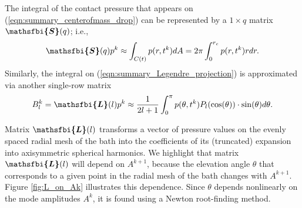 \documentclass{jfm}
\newcommand{\bfjfm}[1]{\bm{\mathsfbi{#1}}}
\begin{document}
The integral of the contact pressure that appears on (\ref{eqn:summary_centerofmass_drop}) can be represented by a $1\times q$ matrix $\bfjfm{S}(q)$; i.e.,
\begin{equation} \label{eqn:discretised_integral_definition}
    \bfjfm{S}(q) p^{k} \approx \int_{C(t)} p(r,t^k) dA = 2\pi \int_0^{r_c}  p(r, t^k) r dr.
\end{equation}
Similarly, the integral on (\ref{eqn:summary_Legendre_projection}) is approximated via another single-row matrix
\begin{equation}
\label{eqn:discretised_projection}
    B^k_l = \bfjfm{L}(l) p^k \approx \frac{1}{2l+1} \int_0^\pi p(\theta, t^k) P_l(\cos(\theta)) \cdot \sin(\theta) d\theta .
\end{equation}

Matrix $\bfjfm{L}(l)$ transforms a vector of pressure values on the evenly spaced radial mesh of the bath into the coefficients of its (truncated) expansion into axisymmetric spherical harmonics. We highlight that matrix $\bfjfm{L}(l)$ will depend on $A^{k+1}$, because the elevation angle $\theta$ that corresponds to a given point in the radial mesh of the bath changes with $A^{k+1}$. Figure \ref{fig:L_on_Ak} illustrates this dependence. Since $\theta$ depends nonlinearly on the mode amplitudes $A^k$, it is found using a Newton root-finding method. 
\end{document}
